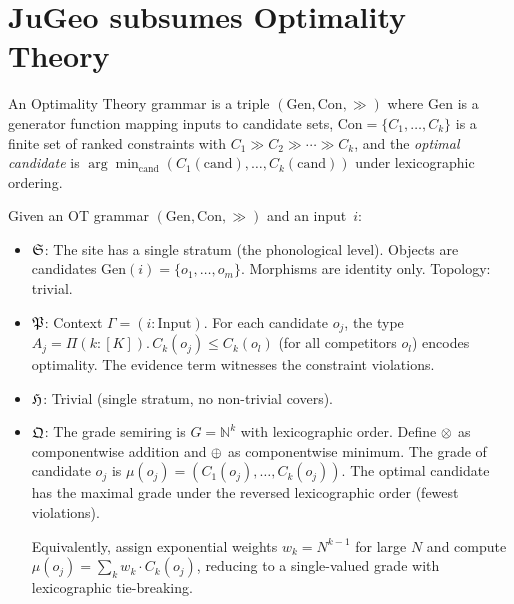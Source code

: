 \section{JuGeo subsumes Optimality Theory}
\label{sec:sub-ot}

\begin{definition}[OT]
\label{def:ot}
An Optimality Theory grammar is a triple
$(\mathrm{Gen}, \mathrm{Con}, \gg)$ where $\mathrm{Gen}$ is a
generator function mapping inputs to candidate sets,
$\mathrm{Con} = \{C_1, \ldots, C_k\}$ is a finite set of ranked
constraints with $C_1 \gg C_2 \gg \cdots \gg C_k$, and the
\emph{optimal candidate} is
$\arg\min_{\mathrm{cand}} (C_1(\mathrm{cand}), \ldots,
C_k(\mathrm{cand}))$ under lexicographic ordering.
\end{definition}

\begin{construction}
\label{con:ot-embed}
Given an OT grammar $(\mathrm{Gen}, \mathrm{Con}, \gg)$ and an
input~$i$:
\begin{itemize}[nosep]
\item $\mathfrak{S}$: The site has a single stratum (the phonological
  level).  Objects are candidates
  $\mathrm{Gen}(i) = \{o_1, \ldots, o_m\}$.
  Morphisms are identity only.  Topology: trivial.

\item $\mathfrak{P}$: Context $\Gamma = (i : \mathrm{Input})$.
  For each candidate $o_j$, the type
  $A_j = \Pi(k : [K]).\, C_k(o_j) \leq C_k(o_l)$ (for all
  competitors $o_l$) encodes optimality.  The evidence term
  witnesses the constraint violations.

\item $\mathfrak{H}$: Trivial (single stratum, no non-trivial covers).

\item $\mathfrak{Q}$: The grade semiring is $G = \mathbb{N}^k$ with
  lexicographic order.  Define $\otimes$ as componentwise addition and
  $\oplus$ as componentwise minimum.  The grade of candidate $o_j$ is
  $\mu(o_j) = (C_1(o_j), \ldots, C_k(o_j))$.  The optimal
  candidate has the maximal grade under the reversed lexicographic
  order (fewest violations).

  Equivalently, assign exponential weights $w_k = N^{k-1}$ for
  large $N$ and compute
  $\mu(o_j) = \sum_k w_k \cdot C_k(o_j)$,
  reducing to a single-valued grade with lexicographic
  tie-breaking.
\end{itemize}
\end{construction}

